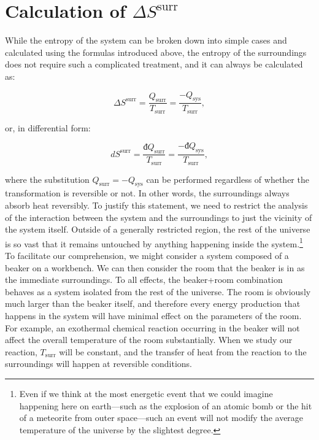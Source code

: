 \documentclass[
  9pt,
]{extbook}
\theoremstyle{definition}
\theoremstyle{definition}
\theoremstyle{definition}
\theoremstyle{remark}
\begin{document}
\hypertarget{dssurr}{%
\section{\texorpdfstring{Calculation of \(\Delta S^{\mathrm{surr}}\)}{Calculation of \textbackslash Delta S\^{}\{\textbackslash mathrm\{surr\}\}}}\label{dssurr}}

While the entropy of the system can be broken down into simple cases and calculated using the formulas introduced above, the entropy of the surroundings does not require such a complicated treatment, and it can always be calculated as:

\begin{equation}
\Delta S^{\mathrm{surr}} = \frac{Q_{\text{surr}}}{T_{\text{surr}}}=\frac{-Q_{\text{sys}}}{T_{\text{surr}}},
\label{eq:dssurr}
\end{equation}

or, in differential form:

\begin{equation}
d S^{\mathrm{surr}} = \frac{đQ_{\text{surr}}}{T_{\text{surr}}}=\frac{-đQ_{\text{sys}}}{T_{\text{surr}}},
\label{eq:dssurrd}
\end{equation}

where the substitution \(Q_{\text{surr}}=-Q_{\text{sys}}\) can be performed regardless of whether the transformation is reversible or not. In other words, the surroundings always absorb heat reversibly. To justify this statement, we need to restrict the analysis of the interaction between the system and the surroundings to just the vicinity of the system itself. Outside of a generally restricted region, the rest of the universe is so vast that it remains untouched by anything happening inside the system.\footnote{Even if we think at the most energetic event that we could imagine happening here on earth---such as the explosion of an atomic bomb or the hit of a meteorite from outer space---such an event will not modify the average temperature of the universe by the slightest degree.} To facilitate our comprehension, we might consider a system composed of a beaker on a workbench. We can then consider the room that the beaker is in as the immediate surroundings. To all effects, the beaker+room combination behaves as a system isolated from the rest of the universe. The room is obviously much larger than the beaker itself, and therefore every energy production that happens in the system will have minimal effect on the parameters of the room. For example, an exothermal chemical reaction occurring in the beaker will not affect the overall temperature of the room substantially. When we study our reaction, \(T_{\text{surr}}\) will be constant, and the transfer of heat from the reaction to the surroundings will happen at reversible conditions.
\end{document}

